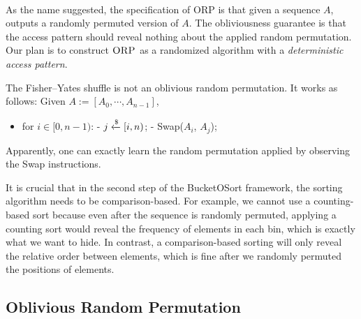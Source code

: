 $ $

As the name suggested, the specification of \textsc{ORP} is that given a sequence $A$, outputs a randomly permuted version of $A$. The obliviousness guarantee is that the access pattern should reveal nothing about the applied random permutation. Our plan is to construct $\textsc{ORP}$ as a randomized algorithm with a \emph{deterministic access pattern}.

\begin{nonexample}
    The Fisher–Yates shuffle is not an oblivious random permutation. It works as follows: Given $A := [A_0, \cdots, A_{n-1}]$,
    \begin{itemize}
        \item for $i \in [0, n-1)$:
        \subitem - $j \xleftarrow{\$}  [i, n)$;
        \subitem - Swap($A_i$, $A_j$);
    \end{itemize}
    Apparently, one can exactly learn the random permutation applied by observing the Swap instructions. 
\end{nonexample}

\begin{remark}
    It is crucial that in the second step of the BucketOSort framework, the sorting algorithm needs to be comparison-based. For example, we cannot use a counting-based sort because even after the sequence is randomly permuted, applying a counting sort would reveal the frequency of elements in each bin, which is exactly what we want to hide. In contrast, a comparison-based sorting will only reveal the relative order between elements, which is fine after we randomly permuted the positions of elements.
\end{remark}

\subsection{Oblivious Random Permutation}

